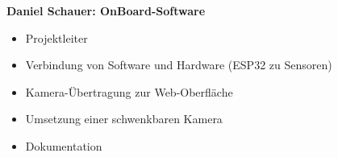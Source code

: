 \documentclass[ngerman,12pt,a4paper]{article}
\begin{document}
\begin{center}
\begin{minipage}{0.65\textwidth}
				\vspace{-40pt}
				\textbf{Daniel Schauer: OnBoard-Software}
				\begin{itemize}
					\item Projektleiter \vspace{-10pt}
					\item Verbindung von Software und Hardware (ESP32 zu Sensoren) \vspace{-10pt}
					\item Kamera-Übertragung zur Web-Oberfläche \vspace{-10pt}
					\item Umsetzung einer schwenkbaren Kamera \vspace{-10pt}
					\item Dokumentation \vspace{-10pt}
				\end{itemize}
			\end{minipage} \\[1cm]
		

\end{center}
\end{document}
